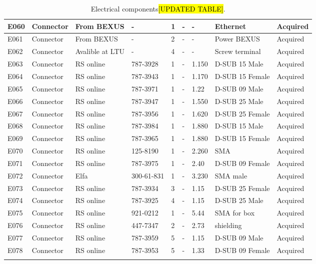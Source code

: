 \begin{longtable}{|m{}|m{}|m{}|m{}|m{}|m{}|m{}|m{}|m{}|}
E060 &	Connector	&	From BEXUS &-	& 1	& -	&	-	& Ethernet	& Acquired \\ \hline
E061 &	Connector	&	From BEXUS &-	& 2	& -	&	-	& Power BEXUS	& Acquired \\ \hline
E062 &	Connector	&	Avalible at LTU  &-	& 4	& -	&	-	& Screw terminal	& Acquired \\ \hline
E063	&	Connector 	& RS online	& 787-3928 & 1	& -  & 1.150 & D-SUB 15 Male& Acquired \\ \hline
E064 &  Connector 	& RS online	& 787-3943 & 1	& -  & 1.170 & D-SUB 15 Female& Acquired \\ \hline
E065 &  Connector 	& RS online	& 787-3971 & 1	& -  & 1.22 &D-SUB 09 Male & Acquired \\ \hline
E066 &  Connector 	& RS online	& 787-3947 & 1	& -  & 1.550 &D-SUB 25 Male & Acquired \\ \hline
E067 &  Connector 	& RS online	& 787-3956 & 1	& -  & 1.620 &D-SUB 25 Female & Acquired \\ \hline
E068 &  Connector 	& RS online	& 787-3984 & 1	& -  & 1.880 &D-SUB 15 Male & Acquired \\ \hline
E069 &  Connector 	& RS online	& 787-3965 & 1	& -  & 1.880 &D-SUB 15 Female & Acquired \\ \hline
E070 &  Connector 	& RS online	& 125-8190 & 1	& -  & 2.260 &SMA & Acquired \\ \hline
E071 &  Connector 	& RS online	&787-3975 & 1	& -  & 2.40 &D-SUB 09 Female& Acquired \\ \hline
E072 &  Connector 	& Elfa &300-61-831 & 1	& -  & 3.230 &SMA male& Acquired \\ \hline
E073 &  Connector 	& RS online	&787-3934 & 3	& -  & 1.15 &D-SUB 25 Female& Acquired \\ \hline
E074 &  Connector 	& RS online	&787-3925 & 4	& -  & 1.15 &D-SUB 25 Male& Acquired \\ \hline
E075 &  Connector 	& RS online	&921-0212& 1	& -  & 5.44 &SMA for box& Acquired \\ \hline
E076 &  Connector 	& RS online	&447-7347& 2	& -  & 2.73 &shielding& Acquired \\ \hline
E077 &  Connector 	& RS online	&787-3959& 5	& -  & 1.15 & D-SUB 09 Male& Acquired \\ \hline
E078 &  Connector 	& RS online	&787-3953& 5	& -  & 1.33 & D-SUB 09 Female& Acquired \\ \hline
 


\caption{Electrical components\hl{[UPDATED TABLE]}.}
\label{tab:component-elec}
\end{longtable}
\raggedbottom